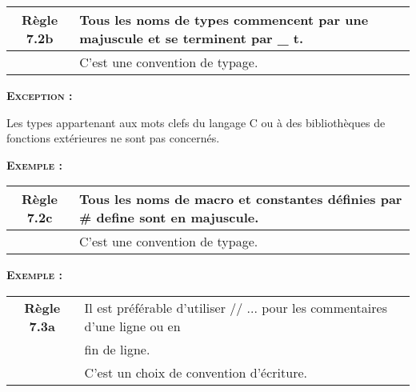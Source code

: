 \medskip

\begin{center}
\begin{tabular}{|c l|}
\hline
\rowcolor{red!10}\textbf{Règle 7.2b} & Tous les noms de types commencent par une majuscule et se terminent par \_ t.\\ \hline
 & C’est une convention de typage.\\ \hline
\hline
\end{tabular}
\end{center}

\smallskip
\begin{large}
\textbf{\textsc{Exception :}}
\end{large}
Les types appartenant aux mots clefs du langage C ou à des bibliothèques de fonctions extérieures ne sont pas concernés.

\smallskip
\begin{large}
\textbf{\textsc{Exemple :}}
\end{large}


\medskip

\begin{center}
\begin{tabular}{|c l|}
\hline
\rowcolor{red!10}\textbf{Règle 7.2c} & Tous les noms de macro et constantes définies par \# define sont en majuscule.\\ \hline
 & C’est une convention de typage.\\ \hline
\hline
\end{tabular}
\end{center}

\smallskip
\begin{large}
\textbf{\textsc{Exemple :}}
\end{large}


\medskip

\begin{center}
\begin{tabular}{|c l|}
\hline
\rowcolor{red!10}\textbf{Règle 7.3a} & Il est préférable d’utiliser // ... pour les commentaires d’une ligne ou en \\
\rowcolor{red!10} & fin de ligne.\\ \hline
 & C’est un choix de convention d’écriture.\\ \hline
\hline
\end{tabular}
\end{center}

